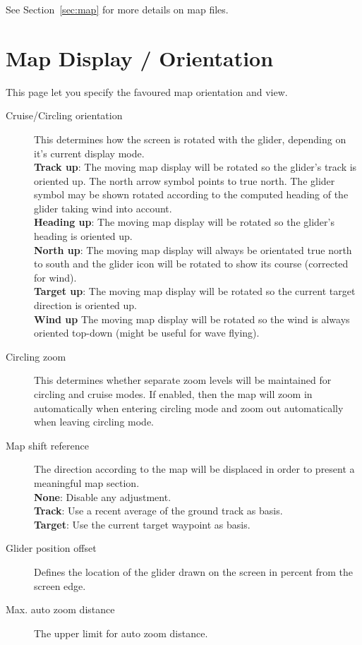 See Section~\ref{sec:map} for more details on map files.


\section{Map Display / Orientation}\label{sec:map-projection}

This page let you specify the favoured map orientation and view.

\begin{description}
\item[Cruise/Circling orientation]  \label{conf:orientation} This determines how
  the screen is rotated with the glider, depending on it's current display mode. \\
  {\bf Track up}: The moving map display will be rotated so the glider's track
  is oriented up. The north arrow symbol points to true north. The glider symbol 
  may be shown rotated according to the computed heading of the glider taking 
  wind into account. \\
  {\bf Heading up}: The moving map display will be rotated so the glider's 
  heading is oriented up. \\
  {\bf North up}: The moving map display will always be orientated true north to
  south and the glider icon will be rotated to show its course (corrected for
  wind). \\
  {\bf Target up}: The moving map display will be rotated so the current target
  direction is oriented up. \\
  {\bf Wind up} The moving map display will be rotated so the wind is always 
  oriented top-down (might be useful for wave flying).
\item[Circling zoom]  \label{conf:circlingzoom} This determines whether separate
  zoom levels will be maintained for circling and cruise modes.  If enabled, then the 
  map will zoom in automatically when entering circling mode and zoom out
  automatically when leaving circling mode.
\item[Map shift reference]  The direction according to the map will be displaced 
  in order to present a meaningful map section. \\
  {\bf None}: Disable any adjustment. \\
  {\bf Track}: Use a recent average of the ground track as basis. \\
  {\bf Target}: Use the current target waypoint as basis.
\item[Glider position offset]  \label{conf:gliderposition} Defines the location of the 
  glider drawn on the screen in percent from the screen edge.
\item[Max. auto zoom distance]  The upper limit for auto zoom distance.
\end{description}


